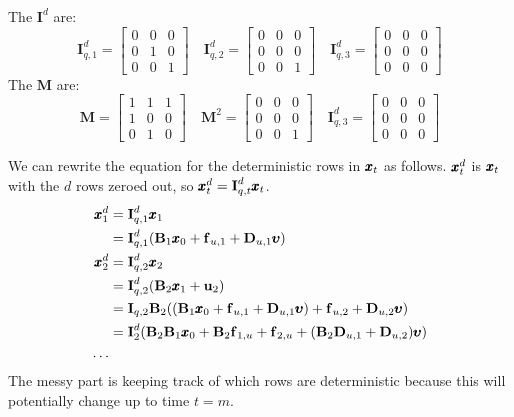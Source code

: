 \documentclass[]{article}
\def\uupsilon{\pmb{\upsilon}}
\def\BB{\mbox{$\mathbf B$}}	\def\bb{\mbox{$\mathbf b$}}
\def\DD{\mbox{$\mathbf D$}}	\def\dd{\mbox{$\mathbf d$}}
\def\II{\mbox{$\mathbf I$}} \def\ii{\mbox{$\mathbf i$}}
\def\MM{\mbox{$\mathbf M$}}  \def\mm{\mbox{$\mathbf m$}}
\begin{document}
The $\II^d$ are:
\begin{equation}
\II_{q,1}^d=\begin{bmatrix}
0&0&0\\
0&1&0\\
0&0&1
\end{bmatrix}
\quad
\II_{q,2}^d=\begin{bmatrix}
0&0&0\\
0&0&0\\
0&0&1
\end{bmatrix}
\quad
\II_{q,3}^d=\begin{bmatrix}
0&0&0\\
0&0&0\\
0&0&0
\end{bmatrix}
\end{equation}
The $\MM$ are:
\begin{equation}
\MM=\begin{bmatrix}
1&1&1\\
1&0&0\\
0&1&0
\end{bmatrix}
\quad
\MM^2=\begin{bmatrix}
0&0&0\\
0&0&0\\
0&0&1
\end{bmatrix}
\quad
\II_{q,3}^d=\begin{bmatrix}
0&0&0\\
0&0&0\\
0&0&0
\end{bmatrix}
\end{equation}

We can rewrite the equation for the deterministic rows in $\mbox{$\pmb{x}$}_t$ as follows. $\mbox{$\pmb{x}$}_t^d$ is $\mbox{$\pmb{x}$}_t$ with the $d$ rows zeroed out, so $\xx_t^d = \II_{q,t}^d\xx_t$.
\begin{equation} \label{eq:xt.det.sum}
\begin{split}
\xx_1^{d}&=\II_{q,1}^d\xx_1\\
         &=\II_{q,1}^d(\BB_1 \xx_0 + \ff_{u,1} + \DD_{u,1}\uupsilon) \\
\xx_2^{d}&=\II_{q,2}^d\xx_2\\
         &=\II_{q,2}^d(\BB_2 \xx_1 + \uu_2)  \\
         &=\II_{q,2}\BB_2((\BB_1 \xx_0 + \ff_{u,1} + \DD_{u,1}\uupsilon) + \ff_{u,2} + \DD_{u,2}\uupsilon) \\
         &=\II_2^d(\BB_2\BB_1 \xx_0 + \BB_2\ff_{1,u} + \ff_{2,u} + (\BB_2\DD_{u,1} +\DD_{u,2})\uupsilon) \\
         \dots \\
\end{split}
\end{equation}
The messy part is keeping track of which rows are deterministic because this will potentially change up to time $t=m$.
\end{document}

